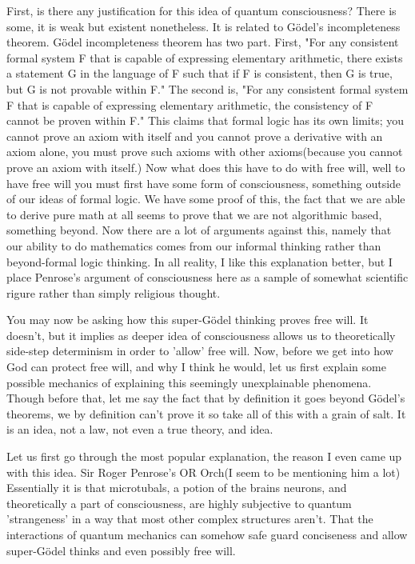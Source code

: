 \par First, is there any justification for this idea of quantum consciousness? There is some, it is weak but existent nonetheless. It is related to Gödel's incompleteness theorem. Gödel incompleteness theorem has two part. First, "For any consistent formal system F that is capable of expressing elementary arithmetic, there exists a statement G in the language of F such that if F is consistent, then G is true, but G is not provable within F." The second is, "For any consistent formal system F that is capable of expressing elementary arithmetic, the consistency of F cannot be proven within F." This claims that formal logic has its own limits; you cannot prove an axiom with itself and you cannot prove a derivative with an axiom alone, you must prove such axioms with other axioms(because you cannot prove an axiom with itself.) Now what does this have to do with free will, well to have free will you must first have some form of consciousness, something outside of our ideas of formal logic. We have some proof of this, the fact that we are able to derive pure math at all seems to prove that we are not algorithmic based, something beyond. Now there are a lot of arguments against this, namely that our ability to do mathematics comes from our informal thinking rather than beyond-formal logic thinking. In all reality, I like this explanation better, but I place Penrose's argument of consciousness here as a sample of somewhat scientific rigure rather than simply religious thought.
\par You may now be asking how this super-Gödel thinking proves free will. It doesn't, but it implies as deeper idea of consciousness allows us to theoretically side-step determinism in order to 'allow' free will. Now, before we get into how God can protect free will, and why I think he would, let us first explain some possible mechanics of explaining this seemingly unexplainable phenomena. Though before that, let me say the fact that by definition it goes beyond Gödel's theorems, we by definition can't prove it so take all of this with a grain  of salt. It is an idea, not a law, not even a true theory, and idea.
\par Let us first go through the most popular explanation, the reason I even came up with this idea. Sir Roger Penrose's OR Orch(I seem to be mentioning him a lot) Essentially it is that microtubals, a potion of the brains neurons, and theoretically a part of consciousness, are highly subjective to quantum 'strangeness' in a way that most other complex structures aren't. That the interactions of quantum mechanics can somehow safe guard conciseness and allow super-Gödel thinks and even possibly free will.
